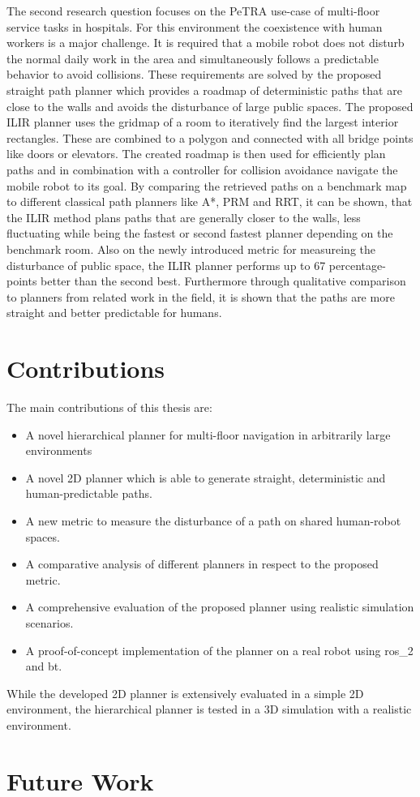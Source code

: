 The second research question focuses on the PeTRA use-case of multi-floor service tasks in hospitals. For this environment the coexistence with human workers is a major challenge. It is required that a mobile robot does not disturb the normal daily work in the area and simultaneously follows a predictable behavior to avoid collisions. These requirements are solved by the proposed straight path planner which provides a roadmap of deterministic paths that are close to the walls and avoids the disturbance of large public spaces. The proposed ILIR planner uses the gridmap of a room to iteratively find the largest interior rectangles. These are combined to a polygon and connected with all bridge points like doors or elevators. The created roadmap is then used for efficiently plan paths and in combination with a controller for collision avoidance navigate the mobile robot to its goal. By comparing the retrieved paths on a benchmark map to different classical path planners like A*, PRM and RRT, it can be shown, that the ILIR method plans paths that are generally closer to the walls, less fluctuating while being the fastest or second fastest planner depending on the benchmark room. Also on the newly introduced metric for measureing the disturbance of public space, the ILIR planner performs up to 67 percentage-points better than the second best. Furthermore through qualitative comparison to planners from related work in the field, it is shown that the paths are more straight and better predictable for humans.

\section{Contributions}
\label{sec:Contributions}

The main contributions of this thesis are:
\begin{itemize}
    \item A novel hierarchical planner for multi-floor navigation in arbitrarily large environments
    \item A novel 2D planner which is able to generate straight, deterministic and human-predictable paths.
    \item A new metric to measure the disturbance of a path on shared human-robot spaces.
    \item A comparative analysis of different planners in respect to the proposed metric.
    \item A comprehensive evaluation of the proposed planner using realistic simulation scenarios.
    \item A proof-of-concept implementation of the planner on a real robot using \gls{ros_2} and \gls{bt}.
\end{itemize}

While the developed 2D planner is extensively evaluated in a simple 2D environment, the hierarchical planner is tested in a 3D simulation with a realistic environment.

\section{Future Work}
\label{sec:future_work}
